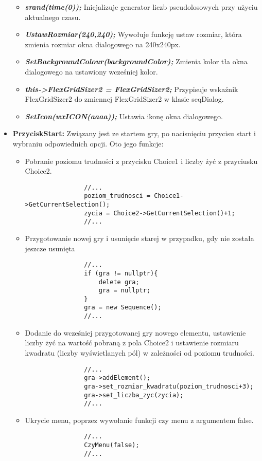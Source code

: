 \documentclass[]{report}
\begin{document}
\begin{itemize}
\begin{itemize}
			\item \textbf{\textit{srand(time(0));}} Inicjalizuje generator liczb pseudolosowych przy użyciu aktualnego czasu.
			\item \textbf{\textit{UstawRozmiar(240,240);}} Wywołuje funkcję ustaw rozmiar, która zmienia rozmiar okna dialogowego na 240x240px.
			\item \textbf{\textit{SetBackgroundColour(backgroundColor);}} Zmienia kolor tła okna dialogowego na ustawiony wcześniej kolor.
			\item \textbf{\textit{this->FlexGridSizer2 = FlexGridSizer2;}} Przypisuje wskaźnik FlexGridSizer2 do zmiennej FlexGridSizer2 w klasie seqDialog.
			\item \textbf{\textit{SetIcon(wxICON(aaaa));}} Ustawia ikonę okna dialogowego.
		\end{itemize}
		\item \textbf{PrzyciskStart:} Związany jest ze startem gry, po nacisnięciu przycisu start i wybraniu odpowiednich opcji. Oto jego funkcje:
		\begin{itemize}
			\item Pobranie poziomu trudności z przycisku Choice1 i liczby żyć z przyciusku Choice2.
			\begin{lstlisting}
				//...
				poziom_trudnosci = Choice1->GetCurrentSelection();
				zycia = Choice2->GetCurrentSelection()+1;
				//...
			\end{lstlisting}
			\item Przygotowanie nowej gry i usunięcie starej w przypadku, gdy nie została jeszcze usunięta
			\begin{lstlisting}
				//...
				if (gra != nullptr){
					delete gra;
					gra = nullptr;
				}
				gra = new Sequence();
				//...
			\end{lstlisting}
			\item Dodanie do wcześniej przygotowanej gry nowego elementu, ustawienie liczby żyć na wartość pobraną z pola Choice2 i ustawienie rozmiaru kwadratu (liczby wyświetlanych pól) w zależności od poziomu trudności.
			\begin{lstlisting}
				//...
				gra->addElement();
				gra->set_rozmiar_kwadratu(poziom_trudnosci+3);
				gra->set_liczba_zyc(zycia);
				//...
			\end{lstlisting}
			\item Ukrycie menu, poprzez wywołanie funkcji czy menu z argumentem false.
			\begin{lstlisting}
				//...
				CzyMenu(false);
				//...
			\end{lstlisting}

\end{itemize}
\end{itemize}
\end{document}
